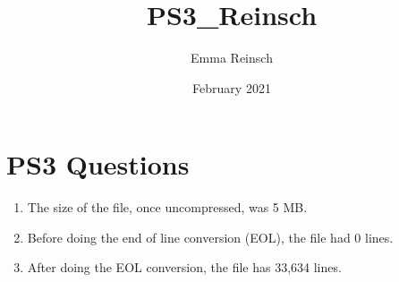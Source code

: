 \documentclass{article}
\title{PS3_Reinsch}
\author{Emma Reinsch}
\date{February 2021}
\begin{document}
\maketitle

\section{PS3 Questions}
\begin{enumerate}
    \item The size of the file, once uncompressed, was 5 MB.
    \item Before doing the end of line conversion (EOL), the file had 0 lines.
    \item After doing the EOL conversion, the file has 33,634 lines.
\end{enumerate}
\end{document}
